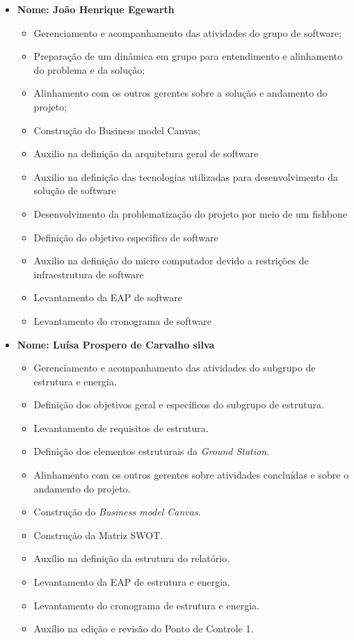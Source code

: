 \begin{itemize}
\begin{itemize}
        
    \end{itemize}
    
    
    \item \textbf{Nome: João Henrique Egewarth}
    \begin{itemize}
        \item Gerenciamento e acompanhamento das atividades do grupo de software;
        \item Preparação de um dinâmica em grupo para entendimento e alinhamento do problema e da solução;
        \item Alinhamento com os outros gerentes sobre a solução e andamento do projeto;
        \item Construção do Business model Canvas;
        \item Auxilio na definição da arquitetura geral de software
        \item Auxilio na definição das tecnologias utilizadas para desenvolvimento da solução de software
        \item Desenvolvimento da problematização do projeto por meio de um fishbone
        \item Definição do objetivo especifico de software
        \item Auxilio na definição do micro computador devido a restrições de infraestrutura de software
        \item Levantamento da EAP de software
        \item Levantamento do cronograma de software
    \end{itemize}
    
    \item \textbf{Nome: Luísa Prospero de Carvalho silva}
    \begin{itemize}
        \item Gerenciamento e acompanhamento das atividades do subgrupo de estrutura e energia.
        \item Definição dos objetivos geral e específicos do subgrupo de estrutura.  
        \item Levantamento de requisitos de estrutura.
        \item Definição dos elementos estruturais da \textit{Ground Station}.
        \item Alinhamento com os outros gerentes sobre atividades concluídas e sobre o andamento do projeto.
        \item Construção do \textit{Business model Canvas}. 
        \item Construção da Matriz SWOT.
        \item Auxílio na definição da estrutura do relatório.
        \item Levantamento da EAP de estrutura e energia.
        \item Levantamento do cronograma de estrutura e energia.
        \item Auxílio na edição e revisão do Ponto de Controle 1. 
        

\end{itemize}
\end{itemize}
